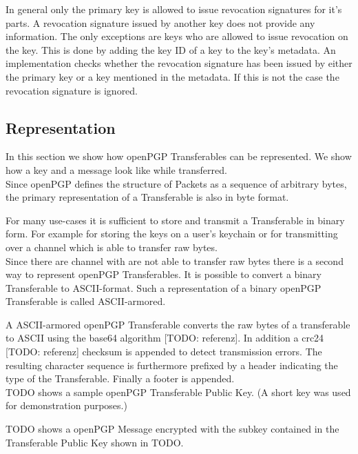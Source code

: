 In general only the primary key is allowed to issue revocation signatures for it's parts. A revocation signature issued by another key does not provide any information. The only exceptions are keys who are allowed to issue revocation on the key. This is done by adding the key ID of a key to the key's metadata. An implementation checks whether the revocation signature has been issued by either the primary key or a key mentioned in the metadata. If this is not the case the revocation signature is ignored.

\subsection{Representation}

In this section we show how openPGP Transferables can be represented. We show how a key and a message look like while transferred. \\

Since openPGP defines the structure of Packets as a sequence of arbitrary bytes, the primary representation of a Transferable is also in byte format.

For many use-cases it is sufficient to store and transmit a Transferable in binary form. For example for storing the keys on a user's keychain or for transmitting over a channel which is able to transfer raw bytes. \\


Since there are channel with are not able to transfer raw bytes there is a second way to represent openPGP Transferables. It is possible to convert a binary Transferable to ASCII-format. Such a representation of a binary openPGP Transferable is called ASCII-armored.

A ASCII-armored openPGP Transferable converts the raw bytes of a transferable to ASCII using the base64 algorithm [TODO: referenz]. In addition a crc24 [TODO: referenz] checksum is appended to detect transmission errors. The resulting character sequence is furthermore prefixed by a header indicating the type of the Transferable. Finally a footer is appended. \\

TODO shows a sample openPGP Transferable Public Key. (A short key was used for demonstration purposes.)

TODO shows a openPGP Message encrypted with the subkey contained in the Transferable Public Key shown in TODO.


